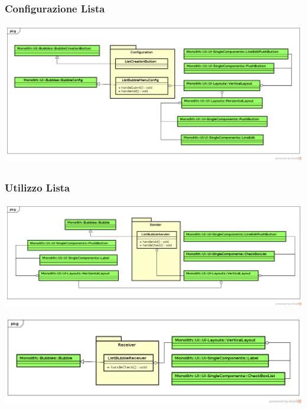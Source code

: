 \subsection{}
\begin{frame}
	\frametitle{Configurazione Lista}
	\begin{center}
		\includegraphics[scale=0.25]{img/listchecklistConfiguration.png}
	\end{center}
\end{frame}

\subsection{}
\begin{frame}
	\frametitle{Utilizzo Lista}
	\begin{center}
		\includegraphics[scale=0.25]{img/listchecklistSender.png}
	\end{center}
	\begin{center}
		\includegraphics[scale=0.30]{img/listchecklistReceiver.png}
	\end{center}
\end{frame}
